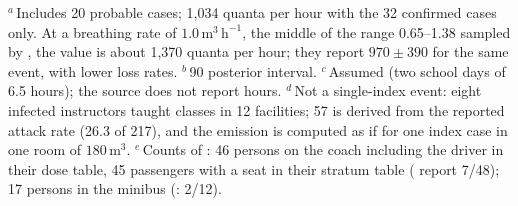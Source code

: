 \begin{table}[tbp]
  \smallskip
  \begin{minipage}{0.96\textwidth}\footnotesize
  $^{a}$\,Includes 20 probable cases; 1{,}034 quanta per hour with the 32 confirmed cases only. At a breathing
  rate of $1.0\,\mathrm{m^3\,h^{-1}}$, the middle of the range 0.65--1.38 sampled by \citet{miller2021}, the
  value is about 1{,}370 quanta per hour; they report $970\pm390$ for the same event, with lower loss rates.
  $^{b}$\,90\pct{} posterior interval.
  $^{c}$\,Assumed (two school days of 6.5 hours); the source does not report hours.
  $^{d}$\,Not a single-index event: eight infected instructors taught classes in 12 facilities; 57 is derived
  from the reported attack rate (26.3\pct{} of 217), and the emission is computed as if for one index case in
  one room of $180\,\mathrm{m^3}$.
  $^{e}$\,Counts of \citet{ou2022}: 46 persons on the coach including the driver in their dose table, 45
  passengers with a seat in their stratum table (\citet{luo2020} report 7/48); 17 persons in the minibus
  (\citet{luo2020}: 2/12).
  \end{minipage}
\end{table}

